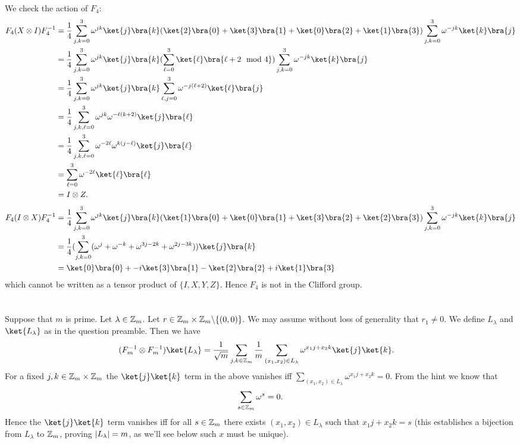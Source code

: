 \documentclass[letterpaper,12pt,oneside,onecolumn]{article}
\DeclarePairedDelimiter\abs{\lvert}{\rvert}%
\begin{document}
\paragraph{}
We check the action of $F_4$:
\begin{align*}
F_4(X\otimes I) F_4^{-1} &= \frac{1}{4} \sum_{j,k = 0}^3 \omega^{jk}\ket{j}\bra{k}(\ket{2}\bra{0} + \ket{3}\bra{1} + \ket{0}\bra{2} + \ket{1}\bra{3})\sum_{j,k = 0}^3 \omega^{-jk}\ket{k}\bra{j}\\
&= \frac{1}{4} \sum_{j,k = 0}^3 \omega^{jk}\ket{j}\bra{k}(\sum_{\ell=0}^3 \ket{\ell}\bra{\ell + 2 \mod 4})\sum_{j,k=0}^3\omega^{-jk}\ket{k}\bra{j}\\
&=  \frac{1}{4} \sum_{j,k = 0}^3 \omega^{jk}\ket{j}\bra{k}\sum_{\ell,j=0}^3 \omega^{-j(\ell+2)}\ket{\ell}\bra{j} \\
&=\frac{1}{4} \sum_{j,k,\ell=0}^3 \omega^{jk}\omega^{-\ell(k+2)}\ket{j}\bra{\ell} \\
&=\frac{1}{4} \sum_{j,k,\ell=0}^3\omega^{-2\ell} \omega^{k(j-\ell)} \ket{j}\bra{\ell}\\
&=\sum_{\ell=0}^3\omega^{-2\ell} \ket{\ell}\bra{\ell}\\
&= I \otimes Z.
\end{align*}
\begin{align*}
F_4(I\otimes X) F_4^{-1} &= \frac{1}{4} \sum_{j,k = 0}^3 \omega^{jk}\ket{j}\bra{k}(\ket{1}\bra{0} + \ket{0}\bra{1} + \ket{3}\bra{2} +\ket{2}\bra{3})\sum_{j,k = 0}^3 \omega^{-jk}\ket{k}\bra{j} \\
&= \frac{1}{4}(\sum_{j,k=0}^3(\omega^{j} + \omega^{-k} + \omega^{3j - 2k} + \omega^{2j - 3k}))\ket{j}\bra{k} \\
&= \ket{0}\bra{0} + -i\ket{3}\bra{1} - \ket{2}\bra{2} + i \ket{1}\bra{3}
\end{align*}
which cannot be written as a tensor product of $\{I, X, Y, Z\}$. Hence $F_4$ is not in the Clifford group.
\section{}
\paragraph{}
Suppose that $m$ is prime. Let $\lambda \in \mathbb{Z}_m$. Let $r \in \mathbb{Z}_m\times \mathbb{Z}_m \backslash \{(0,0)\}$. We may assume without loss of generality that $r_1 \neq 0$. We define $L_\lambda$ and $\ket{L_\lambda}$ as in the question preamble. Then we have
\begin{align*}
(F^{-1}_m \otimes F^{-1}_m) \ket{L_\lambda} &= \frac{1}{\sqrt{m}} \sum_{j,k \in \Z_m} \frac{1}{m} \sum_{(x_1,x_2) \in L_\lambda}\omega^{x_1j + x_2k}\ket{j}\ket{k}.
\end{align*}
For a fixed $j,k \in \mathbb{Z}_m\times \mathbb{Z}_m$ the $\ket{j}\ket{k}$ term in the above vanishes iff $\sum_{(x_1,x_2) \in L_\lambda}\omega^{x_1j + x_2k} = 0$.  From the hint we know that $$\sum_{s \in \mathbb{Z}_m} \omega^s = 0.$$
Hence the $\ket{j}\ket{k}$ term vanishes iff for all $s \in \mathbb{Z}_m$ there exists $(x_1,x_2) \in L_\lambda$ such that $x_1j + x_2k = s$ (this establishes a bijection from $L_\lambda$ to $\mathbb{Z}_m$, proving $\abs{L_\lambda} = m$, as we'll see below such $x$ must be unique).
\end{document}
